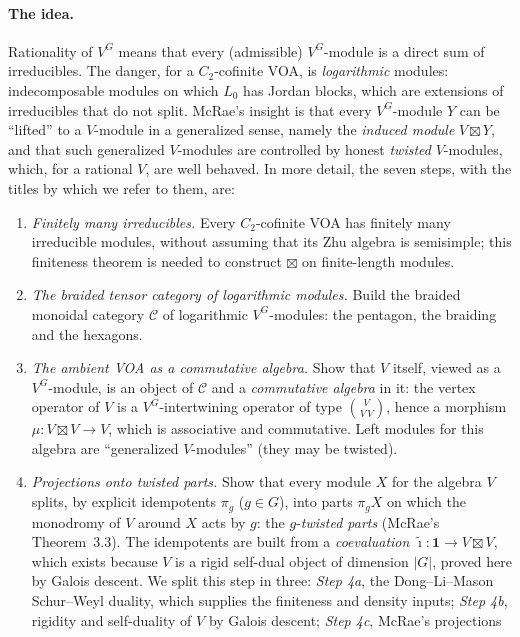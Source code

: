 \paragraph{The idea.} Rationality of $V^G$ means that every (admissible) $V^G$-module is a direct sum of
irreducibles. The danger, for a $C_2$-cofinite VOA, is \emph{logarithmic} modules: indecomposable modules on which
$L_0$ has Jordan blocks, which are extensions of irreducibles that do not split. McRae's insight is that every
$V^G$-module $Y$ can be ``lifted'' to a $V$-module in a generalized sense, namely the \emph{induced module}
$V\boxtimes Y$, and that such generalized $V$-modules are controlled by honest \emph{twisted} $V$-modules, which, for a
rational $V$, are well behaved. In more detail, the seven steps, with the titles by which we refer to them, are:
\begin{enumerate}
\item[Step 1.] \emph{Finitely many irreducibles.} Every $C_2$-cofinite VOA has finitely many irreducible modules,
  without assuming that its Zhu algebra is semisimple; this finiteness theorem is needed to construct $\boxtimes$ on
  finite-length modules.
\item[Step 2.] \emph{The braided tensor category of logarithmic modules.} Build the braided monoidal category
  $\mathcal C$ of logarithmic $V^G$-modules: the pentagon, the braiding and the hexagons.
\item[Step 3.] \emph{The ambient VOA as a commutative algebra.} Show that $V$ itself, viewed as a $V^G$-module, is an object of $\mathcal C$ and a \emph{commutative
  algebra} in it: the vertex operator of $V$ is a $V^G$-intertwining operator of type $\binom{V}{V\,V}$, hence a morphism
  $\mu:V\boxtimes V\to V$, which is associative and commutative. Left modules for this algebra are ``generalized
  $V$-modules'' (they may be twisted).
\item[Step 4.] \emph{Projections onto twisted parts.} Show that every module $X$ for the algebra $V$ splits, by explicit idempotents $\pi_g$ ($g\in G$), into
  parts $\pi_gX$ on which the monodromy of $V$ around $X$ acts by $g$: the $g$-\emph{twisted parts} (McRae's
  Theorem~3.3). The idempotents are built from a \emph{coevaluation} $\tilde\imath:\mathbf 1\to V\boxtimes V$, which
  exists because $V$ is a rigid self-dual object of dimension $|G|$, proved here by Galois descent. We split this
  step in three: \emph{Step 4a}, the Dong--Li--Mason Schur--Weyl duality, which supplies the finiteness and density
  inputs; \emph{Step 4b}, rigidity and self-duality of $V$ by Galois descent; \emph{Step 4c}, McRae's projections

\end{enumerate}
